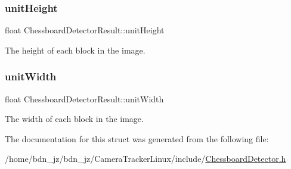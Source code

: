 \subsubsection{\texorpdfstring{unit\+Height}{unitHeight}}
{\footnotesize\ttfamily float Chessboard\+Detector\+Result\+::unit\+Height}

The height of each block in the image. \mbox{\label{struct_chessboard_detector_result_a967889233f9ea3e34e7b215041105801}} 
\subsubsection{\texorpdfstring{unit\+Width}{unitWidth}}
{\footnotesize\ttfamily float Chessboard\+Detector\+Result\+::unit\+Width}

The width of each block in the image. 

The documentation for this struct was generated from the following file\+:\begin{DoxyCompactItemize}
\item 
/home/bdn\+\_\+jz/bdn\+\_\+jz/\+Camera\+Tracker\+Linux/include/\hyperlink{_chessboard_detector_8h}{Chessboard\+Detector.\+h}\end{DoxyCompactItemize}
